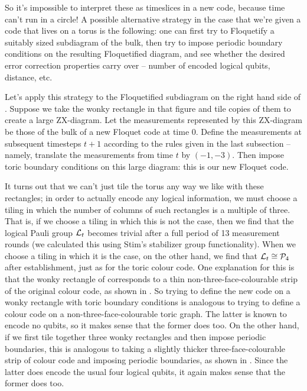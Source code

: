 So it's impossible to interpret these as timeslices in a new code, because time can't run in a circle!
A possible alternative strategy in the case that we're given a code that lives on a torus is the following:
one can first try to Floquetify a suitably sized subdiagram of the bulk, then try to impose periodic boundary conditions on the resulting Floquetified diagram,
and see whether the desired error correction properties carry over -- number of encoded logical qubits, distance, etc.

Let's apply this strategy to the Floquetified subdiagram on the right hand side of .
Suppose we take the wonky rectangle in that figure and tile copies of them to create a large ZX-diagram.
Let the measurements represented by this ZX-diagram be those of the bulk of a new Floquet code at time $0$.
Define the measurements at subsequent timesteps $t+1$ according to the rules given in the last subsection -- namely, translate the measurements from time $t$ by $(-1, -3)$.
Then impose toric boundary conditions on this large diagram: this is our new Floquet code.

It turns out that we can't just tile the torus any way we like with these rectangles;
in order to actually encode any logical information,
we must choose a tiling in which the number of columns of such rectangles is a multiple of three.
That is, if we choose a tiling in which this is not the case,
then we find that the logical Pauli group $\mathcal{L}_{t}$ becomes trivial after a full period of 13 measurement rounds
(we calculated this using Stim's stabilizer group functionality).
When we choose a tiling in which it is the case, on the other hand,
we find that $\mathcal{L}_{t} \cong \mathcal{P}_4$ after establishment, just as for the toric colour code.
One explanation for this is that the wonky rectangle of  corresponds to a thin non-three-face-colourable strip of the original colour code, as shown in .
So trying to define the new code on a wonky rectangle with toric boundary conditions is analogous to trying to define a colour code on a non-three-face-colourable toric graph.
The latter is known to encode no qubits, so it makes sense that the former does too.
On the other hand, if we first tile together three wonky rectangles and then impose periodic boundaries, this is analogous to taking a slightly thicker three-face-colourable strip of colour code and imposing periodic boundaries, as shown in .
Since the latter does encode the usual four logical qubits, it again makes sense that the former does too.

